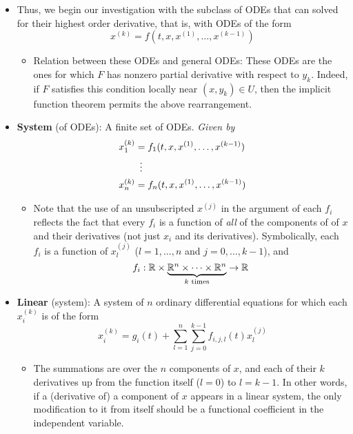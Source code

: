 \documentclass[../notes.tex]{subfiles}
\begin{document}
\begin{itemize}
    \item Thus, we begin our investigation with the subclass of ODEs that can solved for their highest order derivative, that is, with ODEs of the form
    \begin{equation*}
        x^{(k)} = f(t,x,x^{(1)},\dots,x^{(k-1)})
    \end{equation*}
    \begin{itemize}
        \item Relation between these ODEs and general ODEs: These ODEs are the ones for which $F$ has nonzero partial derivative with respect to $y_k$. Indeed, if $F$ satisfies this condition locally near $(x,y_k)\in U$, then the implicit function theorem permits the above rearrangement.
    \end{itemize}
    \item \textbf{System} (of ODEs): A finite set of ODEs. \emph{Given by}
    \begin{align*}
        x_1^{(k)} &= f_1(t,x,x^{(1)},\dots,x^{(k-1)})\\
        &\hspace{0.5em}\vdots\\
        x_n^{(k)} &= f_n(t,x,x^{(1)},\dots,x^{(k-1)})
    \end{align*}
    \begin{itemize}
        \item Note that the use of an unsubscripted $x^{(j)}$ in the argument of each $f_i$ reflects the fact that every $f_i$ is a function of \emph{all} of the components of of $x$ and their derivatives (not just $x_i$ and its derivatives). Symbolically, each $f_i$ is a function of $x_l^{(j)}$ ($l=1,\dots,n$ and $j=0,\dots,k-1$), and
        \begin{equation*}
            f_i:\mathbb{R}\times\underbrace{\mathbb{R}^n\times\cdots\times\mathbb{R}^n}_{k\text{ times}}\to\mathbb{R}
        \end{equation*}
    \end{itemize}
    \item \textbf{Linear} (system): A system of $n$ ordinary differential equations for which each $x_i^{(k)}$ is of the form
    \begin{equation*}
        x_i^{(k)} = g_i(t)+\sum_{l=1}^n\sum_{j=0}^{k-1}f_{i,j,l}(t)x_l^{(j)}
    \end{equation*}
    \begin{itemize}
        \item The summations are over the $n$ components of $x$, and each of their $k$ derivatives up from the function itself ($l=0$) to $l=k-1$. In other words, if a (derivative of) a component of $x$ appears in a linear system, the only modification to it from itself should be a functional coefficient in the independent variable.

\end{itemize}
\end{itemize}
\end{document}
